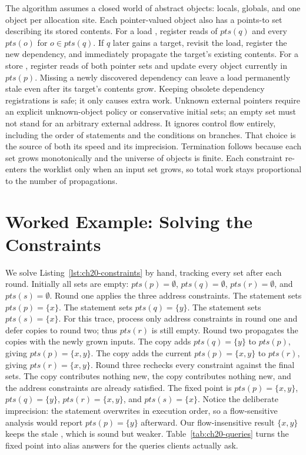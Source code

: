 The algorithm assumes a closed world of abstract objects: locals, globals, and one object per allocation site.
Each pointer-valued object also has a points-to set describing its stored contents.
For a load , register reads of $\mathit{pts}(q)$ and every $\mathit{pts}(o)$ for $o\in\mathit{pts}(q)$.
If $q$ later gains a target, revisit the load, register the new dependency, and immediately propagate the target's existing contents.
For a store , register reads of both pointer sets and update every object currently in $\mathit{pts}(p)$.
Missing a newly discovered dependency can leave a load permanently stale even after its target's contents grow.
Keeping obsolete dependency registrations is safe; it only causes extra work.
Unknown external pointers require an explicit unknown-object policy or conservative initial sets; an empty set must not stand for an arbitrary external address.
It ignores control flow entirely, including the order of statements and the conditions on branches.
That choice is the source of both its speed and its imprecision.
Termination follows because each set grows monotonically and the universe of objects is finite.
Each constraint re-enters the worklist only when an input set grows, so total work stays proportional to the number of propagations.

\section{Worked Example: Solving the Constraints}
\label{sec:ch20-worked-solving}

We solve Listing~\ref{lst:ch20-constraints} by hand, tracking every set after each round.
Initially all sets are empty: $\mathit{pts}(p) = \emptyset$, $\mathit{pts}(q) = \emptyset$, $\mathit{pts}(r) = \emptyset$, and $\mathit{pts}(s) = \emptyset$.
Round one applies the three address constraints.
The statement  sets $\mathit{pts}(p) = \{x\}$.
The statement  sets $\mathit{pts}(q) = \{y\}$.
The statement  sets $\mathit{pts}(s) = \{x\}$.
For this trace, process only address constraints in round one and defer copies to round two; thus $\mathit{pts}(r)$ is still empty.
Round two propagates the copies with the newly grown inputs.
The copy  adds $\mathit{pts}(q) = \{y\}$ to $\mathit{pts}(p)$, giving $\mathit{pts}(p) = \{x, y\}$.
The copy  adds the current $\mathit{pts}(p) = \{x, y\}$ to $\mathit{pts}(r)$, giving $\mathit{pts}(r) = \{x, y\}$.
Round three rechecks every constraint against the final sets.
The copy  contributes nothing new, the copy  contributes nothing new, and the address constraints are already satisfied.
The fixed point is $\mathit{pts}(p) = \{x, y\}$, $\mathit{pts}(q) = \{y\}$, $\mathit{pts}(r) = \{x, y\}$, and $\mathit{pts}(s) = \{x\}$.
Notice the deliberate imprecision: the statement  overwrites  in execution order, so a flow-sensitive analysis would report $\mathit{pts}(p) = \{y\}$ afterward.
Our flow-insensitive result $\{x, y\}$ keeps the stale , which is sound but weaker.
Table~\ref{tab:ch20-queries} turns the fixed point into alias answers for the queries clients actually ask.

